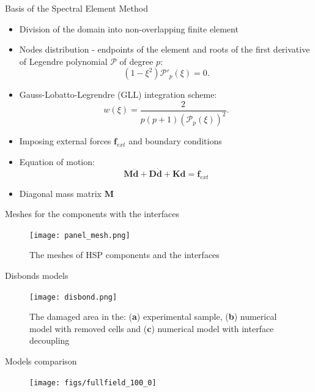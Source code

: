 \documentclass[10pt,aspectratio=169]{beamer} %
\begin{document}
\begin{frame}[label=frame8]{Basis of the Spectral Element Method}
	\begin{itemize}
		\item Division of the domain into non-overlapping finite element
		\item Nodes distribution - endpoints of the element and roots of the first derivative of Legendre polynomial \(\mathcal{P}\) of degree \(p\):
		\begin{equation*}
			(1-\xi^2)\mathcal{P}'_{p}(\xi)=0.
			\label{eq:nodes}
		\end{equation*}
		\item Gauss-Lobatto-Legrendre (GLL) integration scheme:
		\begin{equation*}
			{w(\xi)} = \frac{2}{p(p+1)(\mathcal{P}_{p}(\xi))^2}.
			\label{eq:weight}
		\end{equation*}
		\item Imposing external forces $\textbf{f}_{ext}$ and boundary conditions
		\item Equation of motion:
		\begin{equation*}
			\label{eq:motion}
			\textbf{M} \ddot{\textbf{d}} + \textbf{D} \dot{\textbf{d}} + \textbf{K} \textbf{d} = \textbf{f}_{ext}
		\end{equation*}
		\item Diagonal mass matrix $\textbf{M}$
	\end{itemize}
\end{frame}

\begin{frame}[label=frame11]{Meshes for the components with the interfaces}
	\begin{figure}
		\texttt{[image: panel\_mesh.png]}
		\caption{The meshes of HSP components and the interfaces}
		\label{fig:panel_mesh}
	\end{figure}
\end{frame}
\begin{frame}[label=frame12]{Disbonds models}
	\begin{figure}
		\texttt{[image: disbond.png]}
		\caption{The damaged area in the: (\textbf{a}) experimental sample, (\textbf{b}) numerical model with removed cells and (\textbf{c}) numerical model with interface decoupling}
		\label{fig:disbonds}
	\end{figure}
\end{frame}
\begin{frame}[label=frame11]{Models comparison}
\begin{figure}
	\texttt{[image: figs/fullfield\_100\_0]}
	\label{fig:fulfield_100kHz_0}
\end{figure}
\end{frame}
\end{document}
